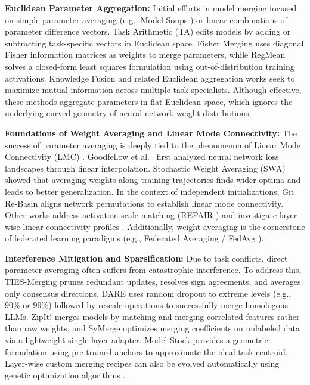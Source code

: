 \documentclass{article}
\theoremstyle{plain}
\theoremstyle{definition}
\theoremstyle{remark}
\begin{document}
\textbf{Euclidean Parameter Aggregation:} Initial efforts in model merging focused on simple parameter averaging (e.g., Model Soups \cite{wortsman2022model}) or linear combinations of parameter difference vectors. Task Arithmetic (TA) \cite{ilharco2022editing} edits models by adding or subtracting task-specific vectors in Euclidean space. Fisher Merging \cite{matena2022merging} uses diagonal Fisher information matrices as weights to merge parameters, while RegMean \cite{jin2023dataless} solves a closed-form least squares formulation using out-of-distribution training activations. Knowledge Fusion \cite{shu2023knowledge} and related Euclidean aggregation works seek to maximize mutual information across multiple task specialists. Although effective, these methods aggregate parameters in flat Euclidean space, which ignores the underlying curved geometry of neural network weight distributions.

\textbf{Foundations of Weight Averaging and Linear Mode Connectivity:} The success of parameter averaging is deeply tied to the phenomenon of Linear Mode Connectivity (LMC) \cite{frankle2020linear}. Goodfellow et al.\ \cite{goodfellow2014qualitatively} first analyzed neural network loss landscapes through linear interpolation. Stochastic Weight Averaging (SWA) \cite{izmailov2018averaging} showed that averaging weights along training trajectories finds wider optima and leads to better generalization. In the context of independent initializations, Git Re-Basin \cite{ainsworth2023git} aligns network permutations to establish linear mode connectivity. Other works address activation scale matching (REPAIR \cite{jordan2022repair}) and investigate layer-wise linear connectivity profiles \cite{adilova2024layer}. Additionally, weight averaging is the cornerstone of federated learning paradigms (e.g., Federated Averaging / FedAvg \cite{mcmahan2017communication}).

\textbf{Interference Mitigation and Sparsification:} Due to task conflicts, direct parameter averaging often suffers from catastrophic interference. To address this, TIES-Merging \cite{yadav2023ties} prunes redundant updates, resolves sign agreements, and averages only consensus directions. DARE \cite{yu2024dare} uses random dropout to extreme levels (e.g., $90\%$ or $99\%$) followed by rescale operations to successfully merge homologous LLMs. ZipIt! \cite{stoica2023zipit} merges models by matching and merging correlated features rather than raw weights, and SyMerge \cite{jung2025symerge} optimizes merging coefficients on unlabeled data via a lightweight single-layer adapter. Model Stock \cite{jang2024model} provides a geometric formulation using pre-trained anchors to approximate the ideal task centroid. Layer-wise custom merging recipes can also be evolved automatically using genetic optimization algorithms \cite{akiba2024evolutionary}.
\end{document}
